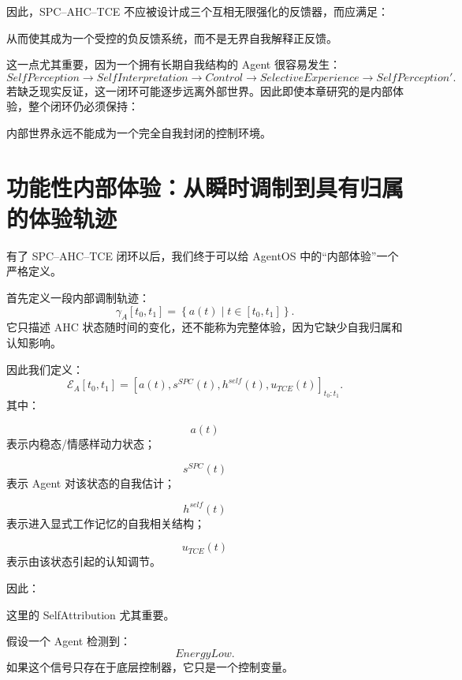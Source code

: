 因此，SPC--AHC--TCE 不应被设计成三个互相无限强化的反馈器，而应满足：
\begin{statementbox}
\centering
{}
\end{statementbox}
从而使其成为一个受控的负反馈系统，而不是无界自我解释正反馈。

这一点尤其重要，因为一个拥有长期自我结构的 Agent 很容易发生：
\[
SelfPerception
\rightarrow
SelfInterpretation
\rightarrow
Control
\rightarrow
SelectiveExperience
\rightarrow
SelfPerception'.
\]
若缺乏现实反证，这一闭环可能逐步远离外部世界。因此即使本章研究的是内部体验，整个闭环仍必须保持：
\begin{statementbox}
\centering
{}
\end{statementbox}
内部世界永远不能成为一个完全自我封闭的控制环境。

\section{功能性内部体验：从瞬时调制到具有归属的体验轨迹}

有了 SPC--AHC--TCE 闭环以后，我们终于可以给 AgentOS 中的``内部体验''一个严格定义。

首先定义一段内部调制轨迹：
\[
\gamma_A[t_0,t_1]
=
\left\{
a(t)
\mid
t\in[t_0,t_1]
\right\}.
\]
它只描述 AHC 状态随时间的变化，还不能称为完整体验，因为它缺少自我归属和认知影响。

因此我们定义：
\[
\boxed{
\mathcal E_A[t_0,t_1]
=
\left[
a(t),
s^{SPC}(t),
h^{self}(t),
u_{TCE}(t)
\right]_{t_0:t_1}.
}
\]
其中：

\[
a(t)
\]
表示内稳态/情感样动力状态；

\[
s^{SPC}(t)
\]
表示 Agent 对该状态的自我估计；

\[
h^{self}(t)
\]
表示进入显式工作记忆的自我相关结构；

\[
u_{TCE}(t)
\]
表示由该状态引起的认知调节。

因此：
\begin{statementbox}
\centering
{}
\end{statementbox}

这里的 SelfAttribution 尤其重要。

假设一个 Agent 检测到：
\[
EnergyLow.
\]
如果这个信号只存在于底层控制器，它只是一个控制变量。


